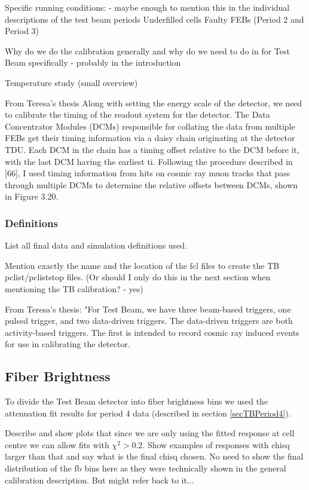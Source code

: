 \documentclass[12pt,a4paper]{article}
\begin{document}
Specific running conditions: - maybe enough to mention this in the individual descriptions of the test beam periods
Underfilled cells
Faulty FEBs (Period 2 and Period 3)

Why do we do the calibration generally and why do we need to do in for Test Beam specifically - probably in the introduction

Temperature study (small overview)

From Teresa's thesis
Along with setting the energy scale of the detector, we need to calibrate the timing of the readout system for the detector. The Data Concentrator Modules (DCMs) responsible for collating the data from multiple FEBs get their timing information via a daisy chain originating at the detector TDU. Each DCM in the chain has a timing offset relative to the DCM before it, with the last DCM having the earliest ti. Following the procedure described in [66], I used timing information from hits on cosmic ray muon tracks that pass through multiple DCMs to determine the relative offsets between DCMs, shown in Figure 3.20.

\subsubsection{Definitions}
List all final data and simulation definitions used.

Mention exactly the name and the location of the fcl files to create the TB pclist/pcliststop files. (Or should I only do this in the next section when mentioning the TB calibration? - yes)

From Teresa's thesis:
"For Test Beam, we have three beam-based triggers, one pulsed trigger, and two data-driven triggers. The data-driven triggers are both activity-based triggers. The first is intended to record cosmic ray induced events for use in calibrating the detector.

\subsection{Fiber Brightness}

To divide the Test Beam detector into fiber brightness bins we used the attenuation fit results for period 4 data (described in section \ref{secTBPeriod4}).

Describe and show plots that since we are only using the fitted response at cell centre we can allow fits with $\chi^2>0.2$. Show examples of responses with chisq larger than that and say what is the final chisq chosen. No need to show the final distribution of the fb bins here as they were technically shown in the general calibration description. But might refer back to it...
\end{document}
